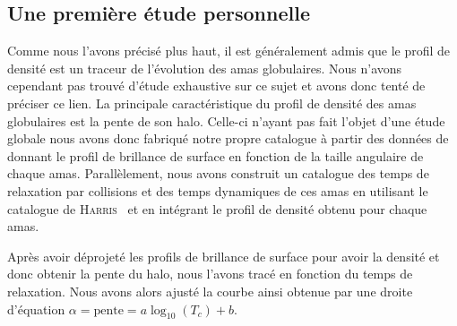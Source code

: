 		\subsection{Une première étude personnelle}

			Comme nous l'avons précisé plus haut, il est généralement admis que le
			profil de densité est un traceur de l'évolution des amas globulaires. Nous
			n'avons cependant pas trouvé d'étude exhaustive sur ce sujet et avons donc
			tenté de préciser ce lien.
			La principale caractéristique du profil de densité des amas globulaires est
			la pente de son halo. Celle-ci n'ayant pas fait l'objet d'une étude globale nous
			avons donc fabriqué notre propre catalogue à partir des données
			de~\cite{Trager-graphe} donnant le profil de brillance de surface en fonction de la taille angulaire
			de chaque amas.
			Parallèlement, nous avons construit un catalogue des temps de relaxation par
			collisions et des temps dynamiques de ces amas en utilisant le catalogue de
			\textsc{Harris}~\cite{Harris} et en intégrant le profil de densité obtenu
			pour chaque amas.




				

				Après avoir déprojeté les profils de brillance de surface
				pour avoir la densité et donc obtenir la pente du halo, nous
				l'avons tracé en fonction du temps de relaxation. Nous avons alors
				ajusté la courbe ainsi obtenue par une droite d'équation $ \alpha =
				\mathrm{pente} = a \log_{10}(T_c) + b$.

